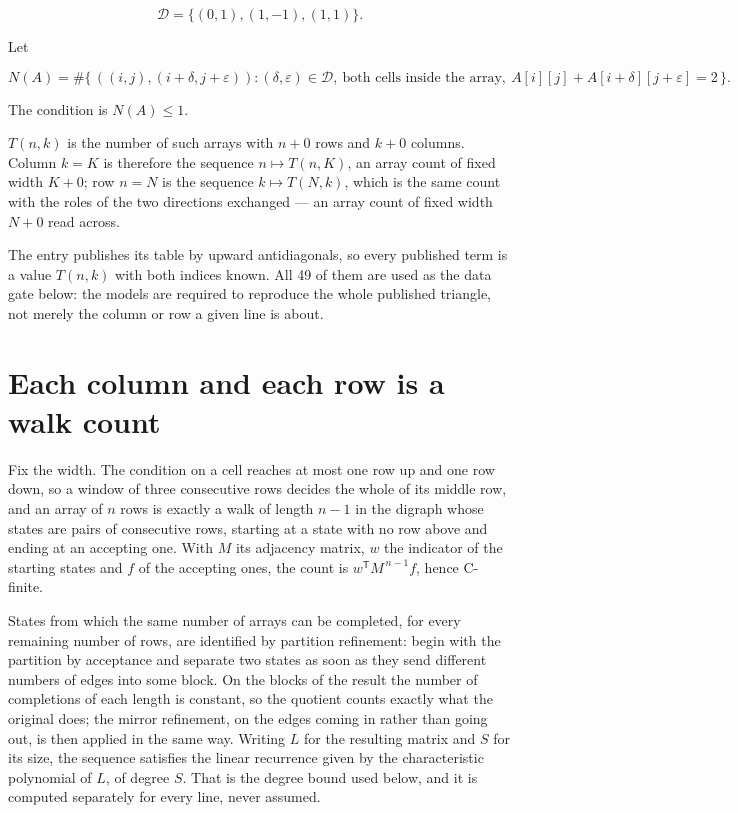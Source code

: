\documentclass[11pt]{article}
\theoremstyle{definition}
\begin{document}
\[\mathcal{D} = \{(0,1), (1,-1), (1,1)\}.\]

Let

\[N(A) = \#\bigl\{\,((i,j),(i{+}\delta,j{+}\varepsilon)) : (\delta,\varepsilon) \in \mathcal{D},\ \text{both cells inside the array},\ A[i][j] + A[i{+}\delta][j{+}\varepsilon] = 2\,\bigr\}.\]

The condition is $N(A) \le 1$.

$T(n,k)$ is the number of such arrays with $n + 0$ rows and $k + 0$ columns. Column $k = K$ is therefore the sequence $n \mapsto T(n,K)$, an array count of fixed width $K + 0$; row $n = N$ is the sequence $k \mapsto T(N,k)$, which is the same count with the roles of the two directions exchanged --- an array count of fixed width $N + 0$ read across.

The entry publishes its table by upward antidiagonals, so every published term is a value $T(n,k)$ with both indices known. All 49 of them are used as the data gate below: the models are required to reproduce the whole published triangle, not merely the column or row a given line is about.

\section{Each column and each row is a walk count}

Fix the width. The condition on a cell reaches at most one row up and one row down, so a window of three consecutive rows decides the whole of its middle row, and an array of $n$ rows is exactly a walk of length $n-1$ in the digraph whose states are pairs of consecutive rows, starting at a state with no row above and ending at an accepting one. With $M$ its adjacency matrix, $w$ the indicator of the starting states and $f$ of the accepting ones, the count is $w^{\mathsf T}M^{\,n-1}f$, hence C-finite.

States from which the same number of arrays can be completed, for every remaining number of rows, are identified by partition refinement: begin with the partition by acceptance and separate two states as soon as they send different numbers of edges into some block. On the blocks of the result the number of completions of each length is constant, so the quotient counts exactly what the original does; the mirror refinement, on the edges coming in rather than going out, is then applied in the same way. Writing $L$ for the resulting matrix and $S$ for its size, the sequence satisfies the linear recurrence given by the characteristic polynomial of $L$, of degree $S$. That is the degree bound used below, and it is computed separately for every line, never assumed.
\end{document}
